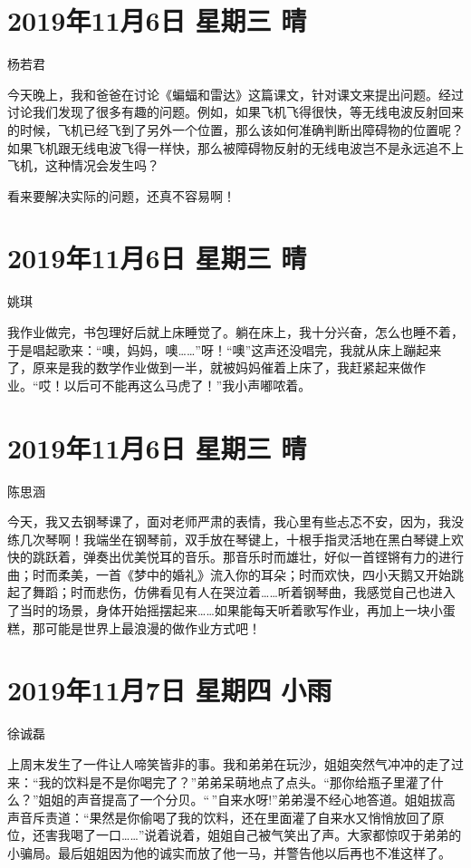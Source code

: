 \section{2019年11月6日 星期三 晴}

杨若君

今天晚上，我和爸爸在讨论《蝙蝠和雷达》这篇课文，针对课文来提出问题。经过讨论我们发现了很多有趣的问题。例如，如果飞机飞得很快，等无线电波反射回来的时候，飞机已经飞到了另外一个位置，那么该如何准确判断出障碍物的位置呢？如果飞机跟无线电波飞得一样快，那么被障碍物反射的无线电波岂不是永远追不上飞机，这种情况会发生吗？

看来要解决实际的问题，还真不容易啊！

\section{2019年11月6日 星期三 晴}

姚琪

我作业做完，书包理好后就上床睡觉了。躺在床上，我十分兴奋，怎么也睡不着，于是唱起歌来：``噢，妈妈，噢\ldots\ldots{}''呀！``噢''这声还没唱完，我就从床上蹦起来了，原来是我的数学作业做到一半，就被妈妈催着上床了，我赶紧起来做作业。``哎！以后可不能再这么马虎了！''我小声嘟哝着。

\section{2019年11月6日 星期三 晴}

陈思涵

今天，我又去钢琴课了，面对老师严肃的表情，我心里有些忐忑不安，因为，我没练几次琴啊！我端坐在钢琴前，双手放在琴键上，十根手指灵活地在黑白琴键上欢快的跳跃着，弹奏出优美悦耳的音乐。那音乐时而雄壮，好似一首铿锵有力的进行曲；时而柔美，一首《梦中的婚礼》流入你的耳朵；时而欢快，四小天鹅又开始跳起了舞蹈；时而悲伤，仿佛看见有人在哭泣着\ldots\ldots 听着钢琴曲，我感觉自己也进入了当时的场景，身体开始摇摆起来\ldots\ldots 如果能每天听着歌写作业，再加上一块小蛋糕，那可能是世界上最浪漫的做作业方式吧！

\section{2019年11月7日 星期四 小雨}

徐诚磊

上周末发生了一件让人啼笑皆非的事。我和弟弟在玩沙，姐姐突然气冲冲的走了过来：``我的饮料是不是你喝完了？''弟弟呆萌地点了点头。``那你给瓶子里灌了什么？''姐姐的声音提高了一个分贝。``\,''自来水呀!''弟弟漫不经心地答道。姐姐拔高声音斥责道：``果然是你偷喝了我的饮料，还在里面灌了自来水又悄悄放回了原位，还害我喝了一口\ldots\ldots{}''说着说着，姐姐自己被气笑出了声。大家都惊叹于弟弟的小骗局。最后姐姐因为他的诚实而放了他一马，并警告他以后再也不准这样了。

